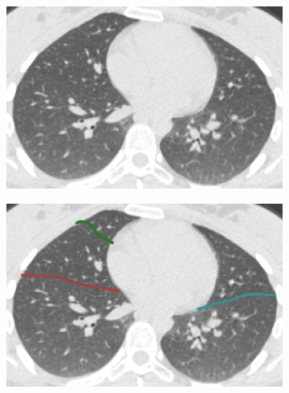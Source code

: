 {\begin{figure}[htbp]
\begin{subfigure}{.32\linewidth}
  \includegraphics[width=\linewidth,trim={{.0\wd0} {.0\wd0} {.0\wd0} {.0\wd0}},clip]{Segmentation/Image/H1335_FRC_Raw_Axial.png}
  \caption{}
  \label{fig:HLASegmentationResults-d} 
\end{subfigure}
\begin{subfigure}{.32\linewidth}%
  \includegraphics[width=\linewidth,trim={{.0\wd0} {.0\wd0} {.0\wd0} {.0\wd0}},clip]{Segmentation/Image/H1335_FRC_PCAInitial_Axial.png}

\end{subfigure}
\end{figure}}
